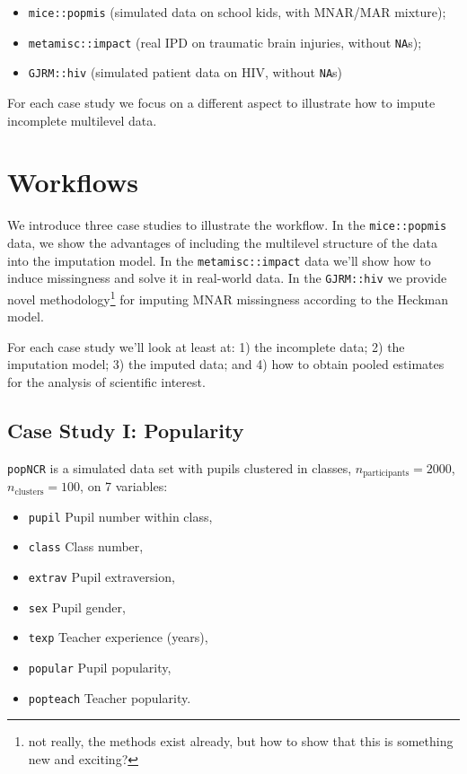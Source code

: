 \documentclass[
]{jss}
\providecommand{\tightlist}{%
  \setlength{\itemsep}{0pt}\setlength{\parskip}{0pt}}
\begin{document}
\begin{itemize}
\item
  \texttt{mice::popmis} (simulated data on school kids, with MNAR/MAR
  mixture);
\item
  \texttt{metamisc::impact} (real IPD on traumatic brain injuries,
  without \texttt{NA}s);
\item
  \texttt{GJRM::hiv} (simulated patient data on HIV, without
  \texttt{NA}s)
\end{itemize}

For each case study we focus on a different aspect to illustrate how to
impute incomplete multilevel data.

\hypertarget{workflows}{%
\section{Workflows}\label{workflows}}

We introduce three case studies to illustrate the workflow. In the
\texttt{mice::popmis} data, we show the advantages of including the
multilevel structure of the data into the imputation model. In the
\texttt{metamisc::impact} data we'll show how to induce missingness and
solve it in real-world data. In the \texttt{GJRM::hiv} we provide novel
methodology\footnote{not really, the methods exist already, but how to
  show that this is something new and exciting?} for imputing MNAR
missingness according to the Heckman model.

For each case study we'll look at least at: 1) the incomplete data; 2)
the imputation model; 3) the imputed data; and 4) how to obtain pooled
estimates for the analysis of scientific interest.

\hypertarget{case-study-i-popularity}{%
\subsection{Case Study I: Popularity}\label{case-study-i-popularity}}

\texttt{popNCR} is a simulated data set with pupils clustered in
classes, \(n_{\text{participants}} = 2000\),
\(n_{\text{clusters}} = 100\), on 7 variables:

\begin{itemize}
\tightlist
\item
  \texttt{pupil} Pupil number within class,
\item
  \texttt{class} Class number,
\item
  \texttt{extrav} Pupil extraversion,
\item
  \texttt{sex} Pupil gender,
\item
  \texttt{texp} Teacher experience (years),
\item
  \texttt{popular} Pupil popularity,
\item
  \texttt{popteach} Teacher popularity.
\end{itemize}
\end{document}
